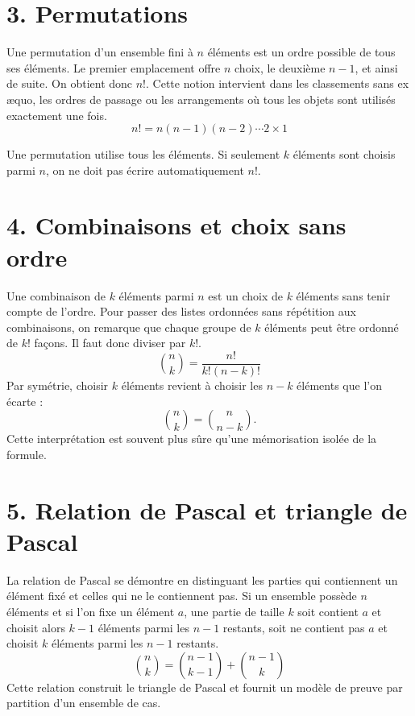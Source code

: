 
\section{3. Permutations}
Une permutation d'un ensemble fini à $n$ éléments est un ordre possible de tous ses éléments. Le premier emplacement offre $n$ choix, le deuxième $n-1$, et ainsi de suite. On obtient donc $n!$. Cette notion intervient dans les classements sans ex æquo, les ordres de passage ou les arrangements où tous les objets sont utilisés exactement une fois.
\[
n!=n(n-1)(n-2)\cdots2\times1
\]
\begin{attention}
Une permutation utilise tous les éléments. Si seulement $k$ éléments sont choisis parmi $n$, on ne doit pas écrire automatiquement $n!$.
\end{attention}

\section{4. Combinaisons et choix sans ordre}
Une combinaison de $k$ éléments parmi $n$ est un choix de $k$ éléments sans tenir compte de l'ordre. Pour passer des listes ordonnées sans répétition aux combinaisons, on remarque que chaque groupe de $k$ éléments peut être ordonné de $k!$ façons. Il faut donc diviser par $k!$.
\[
\binom{n}{k}=\frac{n!}{k!(n-k)!}
\]
Par symétrie, choisir $k$ éléments revient à choisir les $n-k$ éléments que l'on écarte :
\[
\binom{n}{k}=\binom{n}{n-k}.
\]
Cette interprétation est souvent plus sûre qu'une mémorisation isolée de la formule.

\section{5. Relation de Pascal et triangle de Pascal}
La relation de Pascal se démontre en distinguant les parties qui contiennent un élément fixé et celles qui ne le contiennent pas. Si un ensemble possède $n$ éléments et si l'on fixe un élément $a$, une partie de taille $k$ soit contient $a$ et choisit alors $k-1$ éléments parmi les $n-1$ restants, soit ne contient pas $a$ et choisit $k$ éléments parmi les $n-1$ restants.
\[
\binom{n}{k}=\binom{n-1}{k-1}+\binom{n-1}{k}
\]
Cette relation construit le triangle de Pascal et fournit un modèle de preuve par partition d'un ensemble de cas.

